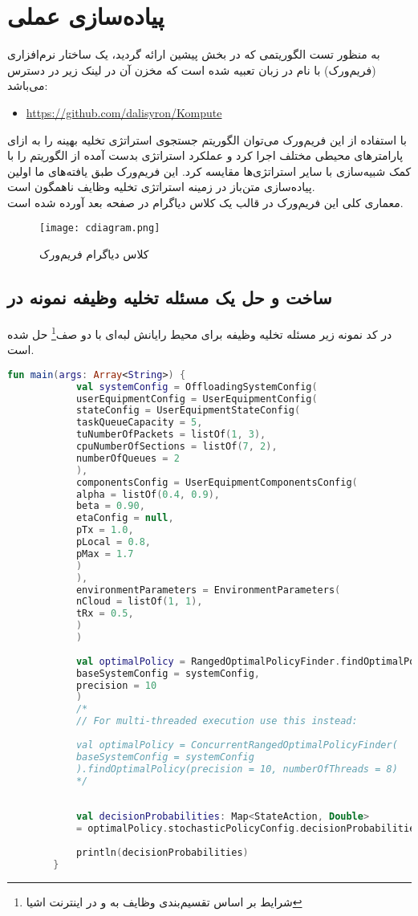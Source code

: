 \chapter{پیاده‌سازی عملی}
به منظور تست الگوریتمی که در بخش پیشین ارائه گردید، یک ساختار نرم‌افزاری (فریم‌ورک) با نام  در زبان  تعبیه شده است که مخزن آن در لینک زیر در دسترس می‌باشد:
\begin{latin}
	\begin{itemize}
		\item \href{https://github.com/dalisyron/Kompute}{https://github.com/dalisyron/Kompute}
	\end{itemize}
\end{latin}
با استفاده از این فریم‌ورک می‌توان الگوریتم جستجوی استراتژی تخلیه بهینه را به ازای پارامترهای محیطی مختلف اجرا کرد و عملکرد استراتژی بدست آمده از الگوریتم را با کمک شبیه‌سازی با سایر استراتژی‌ها مقایسه کرد. این فریم‌ورک طبق یافته‌های ما اولین پیاده‌سازی متن‌باز در زمینه استراتژی تخلیه وظایف ناهمگون است. \\

معماری کلی این فریم‌ورک در قالب یک کلاس دیاگرام در صفحه بعد آورده شده است.
\newpage
\begin{figure}[H]
	\texttt{[image: cdiagram.png]}
	\caption{کلاس دیاگرام فریم‌ورک }
\end{figure}
\newpage
\section{ساخت و حل یک مسئله تخلیه وظیفه نمونه در }
در کد نمونه زیر مسئله تخلیه وظیفه‌ برای محیط رایانش لبه‌ای با دو صف\footnote{شرایط بر اساس تقسیم‌بندی وظایف به  و  در اینترنت اشیا} حل شده است.
\begin{latin}
	\begin{lstlisting}[language=Kotlin]
		fun main(args: Array<String>) {
			val systemConfig = OffloadingSystemConfig(
			userEquipmentConfig = UserEquipmentConfig(
			stateConfig = UserEquipmentStateConfig(
			taskQueueCapacity = 5,
			tuNumberOfPackets = listOf(1, 3),
			cpuNumberOfSections = listOf(7, 2),
			numberOfQueues = 2
			),
			componentsConfig = UserEquipmentComponentsConfig(
			alpha = listOf(0.4, 0.9),
			beta = 0.90,
			etaConfig = null,
			pTx = 1.0,
			pLocal = 0.8,
			pMax = 1.7
			)
			),
			environmentParameters = EnvironmentParameters(
			nCloud = listOf(1, 1),
			tRx = 0.5,
			)
			)
			
			val optimalPolicy = RangedOptimalPolicyFinder.findOptimalPolicy(
			baseSystemConfig = systemConfig, 
			precision = 10
			)
			/*
			// For multi-threaded execution use this instead:
			
			val optimalPolicy = ConcurrentRangedOptimalPolicyFinder(
			baseSystemConfig = systemConfig
			).findOptimalPolicy(precision = 10, numberOfThreads = 8)
			*/
			
			
			val decisionProbabilities: Map<StateAction, Double>
			= optimalPolicy.stochasticPolicyConfig.decisionProbabilities
			
			println(decisionProbabilities)
		}
	\end{lstlisting}
\end{latin}
\newpage